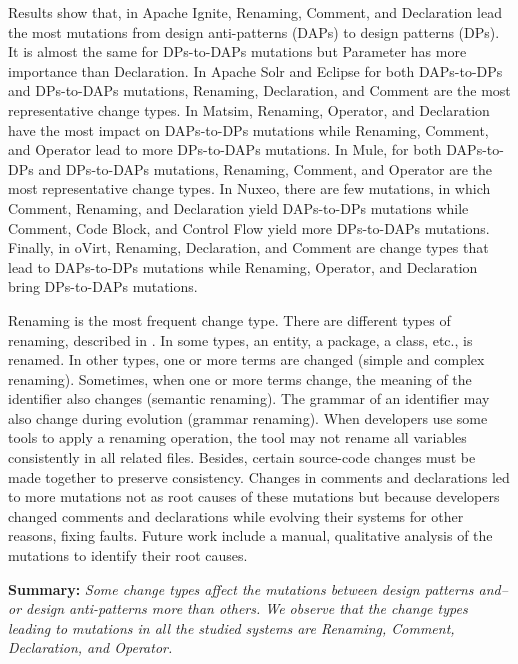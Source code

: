 Results show that, in Apache Ignite, Renaming, Comment, and Declaration lead the most mutations from design anti-patterns (DAPs) to design patterns (DPs). It is almost the same for DPs-to-DAPs mutations but Parameter has more importance than Declaration. In Apache Solr and Eclipse for both DAPs-to-DPs and DPs-to-DAPs mutations, Renaming, Declaration, and Comment are the most representative change types. In Matsim, Renaming, Operator, and Declaration have the most impact on DAPs-to-DPs mutations while Renaming, Comment, and Operator lead to more DPs-to-DAPs mutations. In Mule, for both DAPs-to-DPs and DPs-to-DAPs mutations, Renaming, Comment, and Operator are the most representative change types. In Nuxeo, there are few mutations, in which Comment, Renaming, and Declaration yield DAPs-to-DPs mutations while Comment, Code Block, and Control Flow yield more DPs-to-DAPs mutations. Finally, in oVirt, Renaming, Declaration, and Comment are change types that lead to DAPs-to-DPs mutations while Renaming, Operator, and Declaration bring DPs-to-DAPs mutations.

Renaming is the most frequent change type. There are different types of renaming, described in \cite{arnaoudova2014repent}. In some types, an entity, \eg{} a package, a class, etc., is renamed. In other types, one or more terms are changed (simple and complex renaming). Sometimes, when one or more terms change, the meaning of the identifier also changes (semantic renaming). The grammar of an identifier may also change during evolution (grammar renaming). When developers use some tools to apply a renaming operation, the tool may not rename all variables consistently in all related files. Besides, certain source-code changes must be made together to preserve consistency. Changes in comments and declarations led to more mutations not as root causes of these mutations but because developers changed comments and declarations while evolving their systems for other reasons, \ie{} fixing faults. Future work include a manual, qualitative analysis of the mutations to identify their root causes.

\begin{tcolorbox}
\vspace{-0.1cm}
\textbf{Summary:} \emph{Some change types affect the mutations between design patterns and--or design anti-patterns more than others. We observe that the change types leading to mutations in all the studied systems are Renaming, Comment, Declaration, and Operator.}
\vspace{-0.1cm}
\end{tcolorbox}



